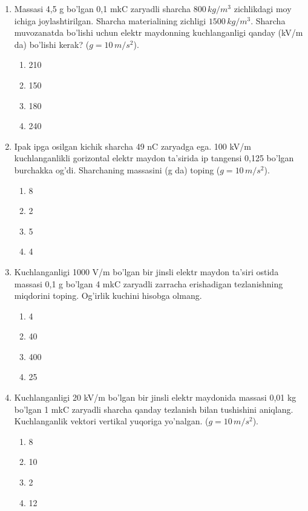 \begin{enumerate}
    \item Massasi 4,5 g bo’lgan 0,1 mkC zaryadli sharcha $800 \, kg/m^3$ zichlikdagi moy ichiga joylashtirilgan. Sharcha materialining zichligi $1500 \, kg/m^3$. Sharcha muvozanatda bo'lishi uchun elektr maydonning kuchlanganligi qanday (kV/m da) bo’lishi kerak? ($g=10 \, m/s^2$). 
    \begin{enumerate}[label=\Alph*)]
        \item 210 %
        \item 150
        \item 180
        \item 240
    \end{enumerate}

    \item Ipak ipga osilgan kichik sharcha 49 nC zaryadga ega. 100 kV/m kuchlanganlikli gorizontal elektr maydon ta'sirida ip tangensi 0,125 bo’lgan burchakka og’di. Sharchaning massasini (g da) toping ($g=10 \, m/s^2$). 
    \begin{enumerate}[label=\Alph*)]
        \item 8
        \item 2
        \item 5
        \item 4 %
    \end{enumerate}

    \item Kuchlanganligi 1000 V/m bo’lgan bir jinsli elektr maydon ta’siri ostida massasi 0,1 g bo’lgan 4 mkC zaryadli zarracha erishadigan tezlanishning miqdorini toping. Og’irlik kuchini hisobga olmang. 
    \begin{enumerate}[label=\Alph*)]
        \item 4
        \item 40 %
        \item 400
        \item 25
    \end{enumerate}

    \item Kuchlanganligi 20 kV/m bo’lgan bir jinsli elektr maydonida massasi 0,01 kg bo’lgan 1 mkC zaryadli sharcha qanday tezlanish bilan tushishini aniqlang. Kuchlanganlik vektori vertikal yuqoriga yo’nalgan. ($g=10 \, m/s^2$). 
    \begin{enumerate}[label=\Alph*)]
        \item 8 %
        \item 10
        \item 2
        \item 12
    \end{enumerate}


\end{enumerate}
